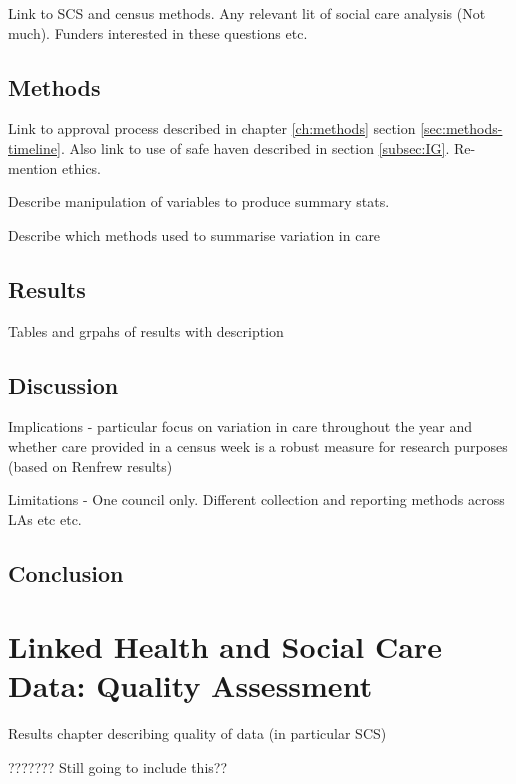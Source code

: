 \documentclass[12pt,]{report}
\begin{document}
Link to SCS and census methods. Any relevant lit of social care analysis
(Not much). Funders interested in these questions etc.

\section{Methods}\label{sec:renf-methods}

Link to approval process described in chapter \ref{ch:methods} section
\ref{sec:methods-timeline}. Also link to use of safe haven described in
section \ref{subsec:IG}. Re-mention ethics.

Describe manipulation of variables to produce summary stats.

Describe which methods used to summarise variation in care

\section{Results}\label{sec:renf-results}

Tables and grpahs of results with description

\section{Discussion}\label{sec:renf-discuss}

Implications - particular focus on variation in care throughout the year
and whether care provided in a census week is a robust measure for
research purposes (based on Renfrew results)

Limitations - One council only. Different collection and reporting
methods across LAs etc etc.

\section{Conclusion}\label{sec:renf-conc}

\FloatBarrier
\newpage
{}

\chapter{Linked Health and Social Care Data: Quality Assessment}\label{ch:quality}

Results chapter describing quality of data (in particular SCS)

??????? Still going to include this??
\end{document}
